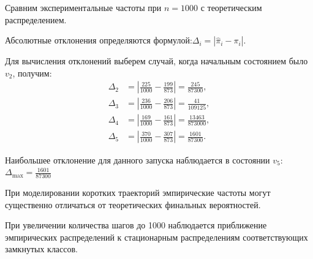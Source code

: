 \documentclass[a4paper, final]{article}
\begin{document}
Сравним экспериментальные частоты при
$n=1000$ с теоретическим распределением.

Абсолютные отклонения определяются формулой:$ \Delta_i=|\hat{\pi}_i-\pi_i|.$

Для вычисления отклонений выберем случай, когда начальным состоянием было $v_2$, получим:
\[
\begin{aligned}
	\Delta_2
	&=\left|\frac{225}{1000}-\frac{199}{873}\right|
	=\frac{245}{87300},\\
	\Delta_3
	&=\left|\frac{236}{1000}-\frac{206}{873}\right|
	=\frac{41}{109125},\\
	\Delta_4
	&=\left|\frac{169}{1000}-\frac{161}{873}\right|
	=\frac{13463}{873000},\\
	\Delta_5
	&=\left|\frac{370}{1000}-\frac{307}{873}\right|
	=\frac{1601}{87300}.
\end{aligned}
\]

Наибольшее отклонение для данного запуска
наблюдается в состоянии $v_5$: ${\Delta_{\max}=\frac{1601}{87300}}$

При моделировании коротких траекторий эмпирические
частоты могут существенно отличаться от
теоретических финальных вероятностей.

При увеличении количества шагов до 1000
наблюдается приближение эмпирических распределений
к стационарным распределениям соответствующих
замкнутых классов.

	
\end{document}
